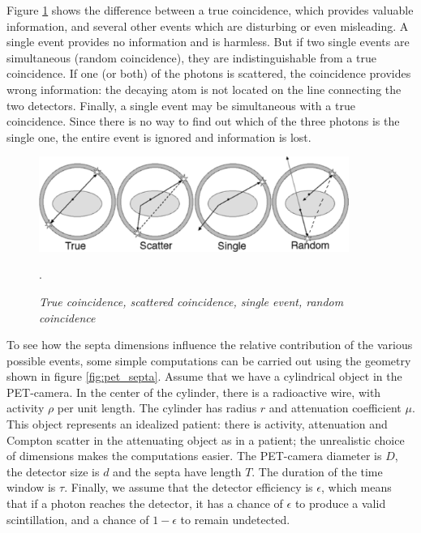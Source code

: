 \documentclass[11pt,oneside]{article}
\begin{document}
Figure \ref{fig:pet_random_enzo} shows the difference between a true
coincidence, which provides valuable information, and several other events
which are disturbing or even misleading. A single event provides no
information and is harmless. But if two single events are simultaneous (random
coincidence), they are indistinguishable from a true coincidence. If one (or
both) of the photons is scattered, the coincidence provides wrong information:
the decaying atom is not located on the line connecting the two
detectors. Finally, a single event may be simultaneous with a true
coincidence. Since there is no way to find out which of the three photons is
the single one, the entire event is ignored and information is lost.

\begin{figure}[tb]
\centering
\includegraphics[width=0.9\textwidth]{figs/fig_pet_random_enzo.pdf}
\caption{\label{fig:pet_random_enzo} \emph{True coincidence, scattered
coincidence, single event, random coincidence}}.
\end{figure}

To see how the septa dimensions influence the relative contribution of the
various possible events, some simple computations can be carried out using the
geometry shown in figure \ref{fig:pet_septa}. Assume that we have a
cylindrical object in the PET-camera. In the center of the cylinder, there is
a radioactive wire, with activity $\rho$ per unit length. The cylinder has
radius $r$ and attenuation coefficient $\mu$. This object represents an
idealized patient: there is activity, attenuation and Compton scatter in the
attenuating object as in a patient; the unrealistic choice of dimensions makes
the computations easier. The PET-camera diameter is $D$, the detector size is
$d$ and the septa have length $T$. The duration of the time window is
$\tau$. Finally, we assume that the detector efficiency is $\epsilon$, which
means that if a photon reaches the detector, it has a chance of $\epsilon$ to
produce a valid scintillation, and a chance of $1 - \epsilon$ to remain
undetected.\\[2mm]
\end{document}
